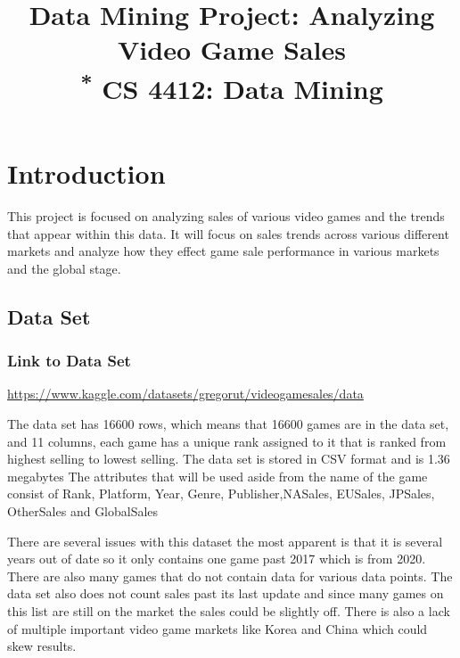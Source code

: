 \documentclass[conference]{IEEEtran}
\begin{document}
\title{Data Mining Project: Analyzing Video Game Sales\\
{\footnotesize \textsuperscript{*} CS 4412: Data Mining}

}

\author{

}
\maketitle

\section{Introduction} This project is focused on analyzing sales of various video games and the trends that appear within this data. It will focus on sales trends across various different markets and analyze how they effect game sale performance in various markets and the global stage.
\subsection{Data Set}
\subsubsection*{Link to Data Set} \url{https://www.kaggle.com/datasets/gregorut/videogamesales/data}

The data set has 16600 rows, which means
that 16600 games are in the data set, and 11 columns,
each game has a unique rank assigned to it that is ranked
from highest selling to lowest selling. The data set is
stored in CSV format and is 1.36 megabytes The attributes that will be used aside from the name of the game consist of Rank, Platform, Year, Genre,
Publisher,NASales, EUSales, JPSales, OtherSales and GlobalSales 

There are several issues with this dataset the most apparent is that it is several years out of date so it only contains one game past 2017 which is from 2020. There are also many games that do not contain data for various data points. The data set also does not count sales past its last update and since many games on this list are still on the market the sales could be slightly off. There is also a lack of multiple important video game markets like Korea and China which could skew results.
\end{document}
